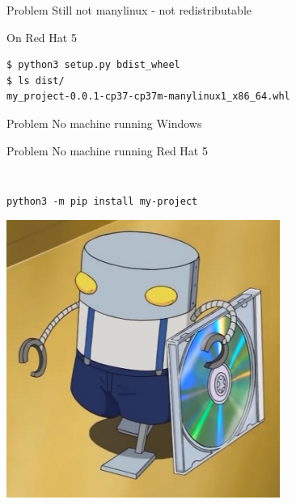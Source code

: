 \documentclass[pdf]{beamer}
\begin{document}
\begin{frame}
    \begin{block}{Problem}
        Still not manylinux - not redistributable
    \end{block}
\end{frame}

\begin{frame}[fragile]
    \begin{block}{On Red Hat 5}
        \begin{verbatim}
$ python3 setup.py bdist_wheel
$ ls dist/
my_project-0.0.1-cp37-cp37m-manylinux1_x86_64.whl
        \end{verbatim}
    \end{block}
\end{frame}

\begin{frame}
    \begin{block}{Problem}
        No machine running Windows
    \end{block}
\end{frame}

\begin{frame}
    \begin{block}{Problem}
        No machine running Red Hat 5
    \end{block}
\end{frame}

\begin{frame}
    \inputminted[firstline = 16, lastline = 20]{yaml}{travis.yml}
\end{frame}

\begin{frame}[fragile]
    \inputminted[firstline = 44, lastline = 54]{yaml}{travis.yml}
\end{frame}

\begin{frame}[fragile]
    \verb|python3 -m pip install my-project|
\end{frame}

\begin{frame}
    \begin{center}
        \includegraphics[height = 0.8\textheight]{img/mechazawa-dist.png}
    \end{center}
\end{frame}
\end{document}
